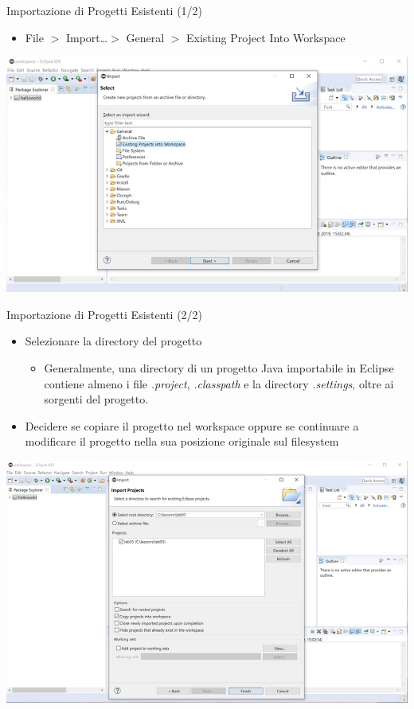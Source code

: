 \documentclass[presentation]{beamer}
\begin{document}
\begin{frame}{Importazione di Progetti Esistenti (1/2)}
\begin{itemize}
\item File $>$ Import\dots $>$ General $>$ Existing Project Into Workspace
\end{itemize}
\begin{center}
\includegraphics[width=\textwidth]{img/eclipse-screenshots/eclipse-ide-06a.jpg}
\end{center}
\end{frame}

\begin{frame}{Importazione di Progetti Esistenti (2/2)}
\begin{itemize}
\item Selezionare la directory del progetto
\begin{itemize}
\item Generalmente, una directory di un progetto Java importabile in Eclipse contiene almeno i file \emph{.project}, \emph{.classpath} e la directory \emph{.settings}, oltre ai sorgenti del progetto.
\end{itemize}
\item Decidere se copiare il progetto nel workspace oppure se continuare a modificare il progetto nella sua posizione originale sul filesystem
\end{itemize}
\begin{center}
\includegraphics[width=\textwidth]{img/eclipse-screenshots/eclipse-ide-06b.jpg}
\end{center}
\end{frame}
\end{document}
